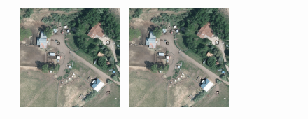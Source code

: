 \begin{figure}[h!]
\begin{tabularx}{\textwidth}{c|*{9}{X}}
    & \includegraphics[trim={730pt 220pt 200pt 720pt},clip,width=\linewidth]{images/015Results/01abb_vs_obb/comp_images/ground_truth_abb/523.png}
    & \includegraphics[trim={850pt 110pt 80pt 830pt},clip,width=\linewidth]{images/015Results/01abb_vs_obb/comp_images/ground_truth_abb/523.png}

\end{tabularx}
\end{figure}
